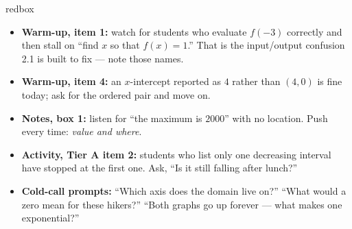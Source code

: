 \documentclass[10pt]{article}
\begin{document}
\begin{skillbox}{redbox}
\begin{itemize}[leftmargin=1.2em, itemsep=2pt, topsep=2pt]
  \item \textbf{Warm-up, item 1:} watch for students who evaluate $f(-3)$ correctly and then stall
        on ``find $x$ so that $f(x)=1$.'' That is the input/output confusion 2.1 is built to fix ---
        note those names.
  \item \textbf{Warm-up, item 4:} an $x$-intercept reported as $4$ rather than $(4,0)$ is fine
        today; ask for the ordered pair and move on.
  \item \textbf{Notes, box 1:} listen for ``the maximum is $2000$'' with no location. Push every
        time: \emph{value and where}.
  \item \textbf{Activity, Tier A item 2:} students who list only one decreasing interval have
        stopped at the first one. Ask, ``Is it still falling after lunch?''
  \item \textbf{Cold-call prompts:} ``Which axis does the domain live on?'' ``What would a zero
        mean for these hikers?'' ``Both graphs go up forever --- what makes one exponential?''
\end{itemize}
\end{skillbox}
\end{document}

